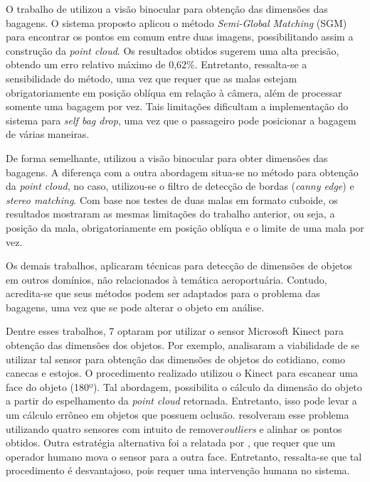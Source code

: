     O trabalho de  utilizou a visão binocular para obtenção das dimensões das bagagens. O sistema proposto aplicou o método \textit{Semi-Global Matching} (SGM) para encontrar os pontos em comum entre duas imagens, possibilitando assim a construção da \textit{point cloud}. Os resultados obtidos sugerem uma alta precisão, obtendo um erro relativo máximo de 0,62\%. Entretanto, ressalta-se a sensibilidade do método, uma vez que requer que as malas estejam obrigatoriamente em posição oblíqua em relação à câmera, além de processar somente uma bagagem por vez. Tais limitações dificultam a implementação do sistema para \textit{self bag drop}, uma vez que o passageiro pode posicionar a bagagem de várias maneiras. 
    
    De forma semelhante,  utilizou a visão binocular para obter dimensões das bagagens. A diferença com a outra abordagem situa-se no método para obtenção da \textit{point cloud}, no caso, utilizou-se o filtro de detecção de bordas (\textit{canny edge}) e \textit{stereo matching}. Com base nos testes de duas malas em formato cuboide, os resultados mostraram as mesmas limitações do trabalho anterior, ou seja, a posição da mala, obrigatoriamente em posição oblíqua e o limite de uma mala por vez. 
    
    Os demais trabalhos, aplicaram técnicas para detecção de dimensões de objetos em outros domínios, não relacionados à temática aeroportuária. Contudo, acredita-se que seus métodos podem ser adaptados para o problema das bagagens, uma vez que se pode alterar o objeto em análise. 
    
    Dentre esses trabalhos, 7 optaram por utilizar o sensor Microsoft Kinect para obtenção das dimensões dos objetos. Por exemplo,  analisaram a viabilidade de se utilizar tal sensor para obtenção das dimensões de objetos do cotidiano, como canecas e estojos. O procedimento realizado utilizou o Kinect para escanear uma face do objeto (180º). Tal abordagem, possibilita o cálculo da dimensão do objeto a partir do espelhamento da \textit{point cloud} retornada. Entretanto, isso pode levar a um cálculo errôneo em objetos que possuem oclusão.  resolveram esse problema utilizando quatro sensores com intuito de remover\textit{outliers} e alinhar os pontos obtidos. Outra estratégia alternativa foi a relatada por , que requer que um operador humano mova o sensor para a outra face. Entretanto, ressalta-se que tal procedimento é desvantajoso, pois requer uma intervenção humana no sistema. 
    
